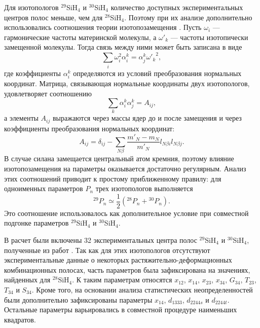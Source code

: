 Для изотопологов ${}^{29}$SiH$_4$ и ${}^{30}$SiH$_4$ количество доступных экспериментальных центров полос
меньше, чем для ${}^{28}$SiH$_4$. Поэтому при их анализе дополнительно использовались соотношения теории
изотопозамещения \cite{byk}. Пусть $\omega_i$ --- гармонические частоты материнской молекулы, а
$\omega'_k$ --- частоты изотопически замещенной молекулы. Тогда связь между ними может быть записана в
виде
\begin{equation}
\sum_i \omega_i^2 \alpha_i^k = \alpha_j^k {\omega'_k}^2,
\label{eq:si_isotope_frequencies}
\end{equation}
где коэффициенты $\alpha_i^k$ определяются из условий преобразования нормальных координат. Матрица,
связывающая нормальные координаты двух изотопологов, удовлетворяет соотношению
\begin{equation}
\sum_k \alpha_i^k \alpha_j^k = A_{ij},
\label{eq:si_alpha_matrix}
\end{equation}
а элементы $A_{ij}$ выражаются через массы ядер до и после замещения и через коэффициенты
преобразования нормальных координат:
\begin{equation}
A_{ij}=\delta_{ij}-\sum_{N\beta}\frac{m'_N-m_N}{m'_N}l_{N\beta i}l_{N\beta j}.
\label{eq:si_aij}
\end{equation}
В случае силана замещается центральный атом кремния, поэтому влияние изотопозамещения на параметры
оказывается достаточно регулярным. Анализ этих соотношений приводит к простому приближенному правилу:
для одноименных параметров $P_n$ трех изотопологов выполняется
\begin{equation}
{}^{29}P_n \simeq \frac{1}{2}\left({}^{28}P_n+{}^{30}P_n\right).
\label{eq:si_isotope_parameter_relation}
\end{equation}
Это соотношение использовалось как дополнительное условие при совместной подгонке параметров
${}^{29}$SiH$_4$ и ${}^{30}$SiH$_4$.

В расчет были включены 32 экспериментальных центра полос ${}^{29}$SiH$_4$ и ${}^{30}$SiH$_4$, полученные из
работ \cite{4302,4301,4303,4300}. Так как для этих изотопологов отсутствуют экспериментальные данные о
некоторых растяжительно-деформационных комбинационных полосах, часть параметров была зафиксирована на
значениях, найденных для ${}^{28}$SiH$_4$. К таким параметрам относятся $x_{12}$, $x_{14}$, $x_{23}$,
$x_{34}$, $G_{34}$, $T_{23}$, $T_{34}$ и $S_{34}$. Кроме того, на основании анализа статистических
неопределенностей были дополнительно зафиксированы параметры $x_{14}$, $d_{1333}$, $d_{2244s}$ и
$d_{2244t}$. Остальные параметры варьировались в совместной процедуре наименьших квадратов.

